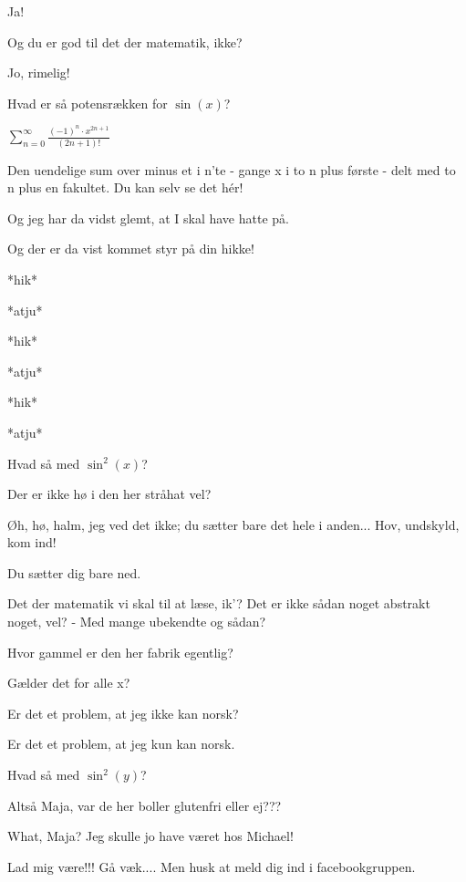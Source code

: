 \documentclass[a4paper,11pt]{article}
\begin{document}
\begin{sketch}
 Ja!

 Og du er god til det der matematik, ikke?

 Jo, rimelig!

 Hvad er så potensrækken for $\sin(x)$?


 $\sum_{n=0}^\infty \frac{(-1)^n\cdot x^{2n+1}}{(2n+1)!}$

 Den uendelige sum over minus et i n'te - gange x i to n plus første - delt med to n plus en fakultet. Du kan selv se det hér!


 Og jeg har da vidst glemt, at I skal have hatte på.


 Og der er da vist kommet styr på din hikke!

 *hik*

 *atju*

 *hik*

 *atju*

 *hik*

 *atju*

 Hvad så med $\sin^2(x)$?

 Der er ikke hø i den her stråhat vel?


 Øh, hø, halm, jeg ved det ikke; du sætter bare det hele i anden... Hov, undskyld, kom ind!

 Du sætter dig bare ned.

 Det der matematik vi skal til at læse, ik’? Det er ikke sådan noget abstrakt noget, vel? - Med mange ubekendte og sådan?



 Hvor gammel er den her fabrik egentlig?

 Gælder det for alle x?

 Er det et problem, at jeg ikke kan norsk?

 Er det et problem, at jeg kun kan norsk.

 Hvad så med $\sin^2(y)$?


 Altså Maja, var de her boller glutenfri eller ej???

 What, Maja? Jeg skulle jo have været hos Michael! 


 Lad mig være!!! Gå væk.... Men husk at meld dig ind i facebookgruppen.

\end{sketch}
\end{document}

